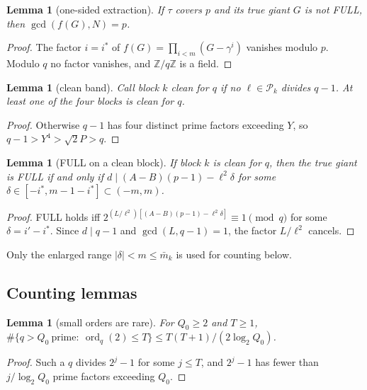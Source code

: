 \documentclass[11pt]{amsart}
\newtheorem{lemma}[theorem]{Lemma}
\theoremstyle{definition}
\newcommand{\Z}{\mathbb{Z}}
\newcommand{\Pk}{\mathcal{P}_k}
\newcommand{\ord}{\operatorname{ord}}
\newcommand{\mbar}{\bar m_k}
\begin{document}
\begin{lemma}[one-sided extraction]\label{lem:extract}
If $\tau$ covers $p$ and its true giant $G$ is not FULL, then $\gcd(f(G),N)=p$.
\end{lemma}
\begin{proof}
The factor $i=i^*$ of $f(G)=\prod_{i<m}(G-\gamma^i)$ vanishes modulo $p$. Modulo $q$ no factor
vanishes, and $\Z/q\Z$ is a field.
\end{proof}

\begin{lemma}[clean band]\label{lem:clean}
Call block $k$ \emph{clean for $q$} if no $\ell\in\Pk$ divides $q-1$. At least one of the four
blocks is clean for $q$.
\end{lemma}
\begin{proof}
Otherwise $q-1$ has four distinct prime factors exceeding $Y$, so $q-1>Y^4>\sqrt2P>q$.
\end{proof}

\begin{lemma}[FULL on a clean block]\label{lem:full}
If block $k$ is clean for $q$, then the true giant is FULL if and only if
$d\mid(A-B)(p-1)-\ell^2\delta$ for some $\delta\in[-i^*,m-1-i^*]\subset(-m,m)$.
\end{lemma}
\begin{proof}
FULL holds iff $2^{(L/\ell^2)[(A-B)(p-1)-\ell^2\delta]}\equiv1\pmod q$ for some
$\delta=i'-i^*$. Since $d\mid q-1$ and $\gcd(L,q-1)=1$, the factor $L/\ell^2$ cancels.
\end{proof}
Only the enlarged range $|\delta|<m\le\mbar$ is used for counting below.

\subsection{Counting lemmas}

\begin{lemma}[small orders are rare]\label{lem:smallorder}
For $Q_0\ge2$ and $T\ge1$,
$\#\{q>Q_0\ \text{prime}:\ \ord_q(2)\le T\}\le T(T+1)/(2\log_2Q_0)$.
\end{lemma}
\begin{proof}
Such a $q$ divides $2^j-1$ for some $j\le T$, and $2^j-1$ has fewer than $j/\log_2Q_0$ prime
factors exceeding $Q_0$.
\end{proof}
\end{document}

